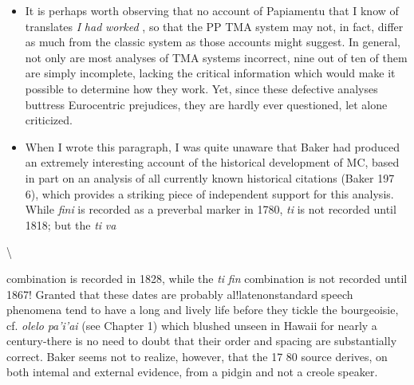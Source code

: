 \begin{itemize}
\begin{itemize}
\begin{itemize}
\begin{itemize}
\begin{itemize}
\begin{itemize}
\begin{itemize}

\item It is perhaps worth observing that no account of Papiamentu that I know of translates \textit{I} \textit{had} \textit{worked} , so that the PP TMA system may not, in fact, differ as much from the classic system as those ac\-counts might suggest. In general, not only are most analyses of TMA systems incorrect, nine out of ten of them are simply incomplete, lacking the critical information which would make it possible to deter\-mine how they work. Yet, since these defective analyses buttress Euro\-centric prejudices, they are hardly ever questioned, let alone criticized.
\item When I wrote this paragraph, I was quite unaware that Baker had produced an extremely interesting account of the historical de\-velopment of MC, based in part on an analysis of all currently known historical citations (Baker 197 6), which provides a striking piece of independent support for this analysis. While \textit{fini} is recorded as a pre\-verbal marker in 1780, \textit{ti }is not recorded until 1818; but the \textit{ti} \textit{va}
\end{itemize}

{\textbackslash}


combination is recorded in 1828, while the \textit{ti} \textit{fin} combination is not recorded until 1867! Granted that these dates are probably al!late\-nonstandard speech phenomena tend to have a long and lively life before they tickle the bourgeoisie, cf. \textit{olelo} \textit{pa'i'ai} (see Chapter 1) which blushed unseen in Hawaii for nearly a century-there is no need to doubt that their order and spacing are substantially correct. Baker seems not to realize, however, that the 17 80 source derives, on both intemal and external evidence, from a pidgin and not a creole speaker.


\end{itemize}
\end{itemize}
\end{itemize}
\end{itemize}
\end{itemize}
\end{itemize}
